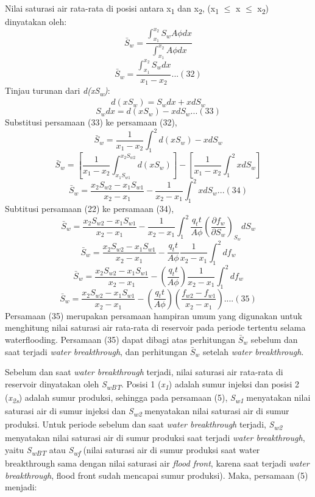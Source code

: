 \documentclass[
]{book}
\begin{document}
Nilai saturasi air rata-rata di posisi antara x\textsubscript{1} dan x\textsubscript{2}, (x\textsubscript{1} \(\leq\) x \(\leq\) x\textsubscript{2}) dinyatakan oleh:
\[\bar S_w = \frac{\int_{x_1}^{x_2}S_wA\phi dx}{\int_{x_1}^{x_2}A\phi dx}\]
\[\bar S_w = \frac{\int_{x_1}^{x_2}S_w dx}{x_1-x_2}...(32)\]
Tinjau turunan dari \emph{d(xS\textsubscript{w})}:
\[d(xS_w) = S_wdx + xdS_w\]
\[S_wdx = d(xS_w) - xdS_w...(33)\]
Substitusi persamaan (33) ke persamaan (32),
\[\bar S_w = \frac{1}{x_1 - x_2} \int_1^2 d(xS_w)-xdS_w\]
\[\bar S_w = \left[ \frac{1}{x_1 - x_2} \int_{x_1S_{w1}}^{x_2S_{w2}} d(xS_w) \right]-\left[ \frac{1}{x_1 - x_2} \int_{1}^{2} xdS_w \right]\]
\[\bar S_w = \frac{x_2S_{w2}-x_1S_{w1}}{x_2-x_1}-\frac{1}{x_2-x_1}\int_1^2xdS_w ...(34)\]
Subtitusi persamaan (22) ke persamaan (34),
\[\bar S_w = \frac{x_2S_{w2}-x_1S_{w1}}{x_2-x_1}-\frac{1}{x_2-x_1}\int_1^2\frac{q_tt}{A\phi} \left( \frac{\partial f_w}{\partial S_w} \right)_{S_w}dS_w\]
\[\bar S_w = \frac{x_2S_{w2}-x_1S_{w1}}{x_2-x_1}-\frac{q_tt}{A\phi}\frac{1}{x_2-x_1}\int_1^2 df_w\]
\[\bar S_w = \frac{x_2S_{w2}-x_1S_{w1}}{x_2-x_1}-\left( \frac{q_tt}{A\phi} \right)\frac{1}{x_2-x_1}\int_1^2 df_w\]
\[\bar S_w = \frac{x_2S_{w2}-x_1S_{w1}}{x_2-x_1}-\left( \frac{q_tt}{A\phi} \right) \left(\frac{f_{w2}-f_{w1}}{x_2-x_1} \right)....(35)\]
Persamaan (35) merupakan persamaan hampiran umum yang digunakan untuk menghitung nilai saturasi air rata-rata di reservoir pada periode tertentu selama waterflooding. Persamaan (35) dapat dibagi atas perhitungan \(\bar S_w\) sebelum dan saat terjadi \emph{water breakthrough}, dan perhitungan \(\bar S_w\) setelah \emph{water breakthrough}.

Sebelum dan saat \emph{water breakthrough} terjadi, nilai saturasi air rata-rata di reservoir dinyatakan oleh \emph{S\textsubscript{wBT}}. Posisi 1 (\emph{x\textsubscript{1}}) adalah sumur injeksi dan posisi 2 (\emph{x\textsubscript{2s}}) adalah sumur produksi, sehingga pada persamaan (5), \emph{S\textsubscript{w1}} menyatakan nilai saturasi air di sumur injeksi dan \emph{S\textsubscript{w2}} menyatakan nilai saturasi air di sumur produksi. Untuk periode sebelum dan saat \emph{water breakthrough} terjadi, \emph{S\textsubscript{w2}} menyatakan nilai saturasi air di sumur produksi saat terjadi \emph{water breakthrough}, yaitu \emph{S\textsubscript{wBT}} atau \emph{S\textsubscript{wf}} (nilai saturasi air di sumur produksi saat water breakthrough sama dengan nilai saturasi air \emph{flood front}, karena saat terjadi \emph{water breakthrough}, flood front sudah mencapai sumur produksi). Maka, persamaan (5) menjadi:
\end{document}
